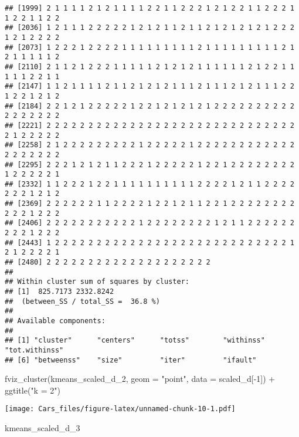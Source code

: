 \documentclass[
]{article}
\newenvironment{Shaded}{\begin{snugshade}}{\end{snugshade}}
\newcommand{\AttributeTok}[1]{\textcolor[rgb]{0.77,0.63,0.00}{#1}}
\newcommand{\DecValTok}[1]{\textcolor[rgb]{0.00,0.00,0.81}{#1}}
\newcommand{\FunctionTok}[1]{\textcolor[rgb]{0.00,0.00,0.00}{#1}}
\newcommand{\NormalTok}[1]{#1}
\newcommand{\SpecialCharTok}[1]{\textcolor[rgb]{0.00,0.00,0.00}{#1}}
\newcommand{\StringTok}[1]{\textcolor[rgb]{0.31,0.60,0.02}{#1}}
\begin{document}
\begin{verbatim}
## [1999] 2 1 1 1 1 2 1 2 1 1 1 1 2 2 1 1 2 2 2 1 2 1 2 2 1 1 2 2 2 1 1 2 2 1 1 2 2
## [2036] 1 2 1 1 1 2 2 2 2 2 1 2 1 2 1 1 2 1 1 2 1 2 1 2 1 2 1 2 2 2 1 2 1 2 2 2 2
## [2073] 1 2 2 2 1 2 2 2 2 1 1 1 1 1 1 1 1 1 2 1 1 1 1 1 1 1 1 1 2 1 2 1 1 1 1 1 2
## [2110] 2 1 1 2 1 2 2 2 1 1 1 1 1 2 1 2 1 2 1 1 1 1 1 1 2 1 2 2 1 1 1 1 1 2 2 1 1
## [2147] 1 1 2 1 1 1 1 2 1 1 2 1 2 1 2 1 1 1 2 1 1 1 2 1 2 1 1 1 2 2 1 2 2 1 2 1 2
## [2184] 2 2 1 2 1 2 2 2 2 2 1 2 2 1 2 1 2 1 2 1 2 2 2 2 2 2 2 2 2 2 2 2 2 2 2 2 2
## [2221] 2 2 2 2 2 2 2 2 2 2 2 2 2 2 2 2 2 2 2 2 2 2 2 2 2 2 2 2 2 2 2 1 2 2 2 2 2
## [2258] 2 1 2 2 2 2 2 2 2 2 2 1 2 2 2 2 2 1 2 2 2 2 2 2 2 2 2 2 2 2 2 2 2 2 2 2 2
## [2295] 2 2 2 1 2 1 2 1 1 2 2 2 1 2 2 2 2 2 1 2 2 1 2 2 2 2 2 2 2 2 1 2 2 2 2 2 1
## [2332] 1 1 2 2 2 1 2 2 1 1 1 1 1 1 1 1 1 1 2 2 2 2 1 2 1 1 2 2 2 2 2 2 2 1 2 1 2
## [2369] 2 2 2 2 2 2 1 1 2 2 2 2 1 2 2 1 2 1 1 2 2 1 2 2 2 2 2 2 2 2 2 2 2 1 2 2 2
## [2406] 2 2 2 2 2 2 2 2 2 2 2 1 2 2 2 2 2 2 2 2 1 2 1 1 2 2 2 2 2 2 2 2 2 1 2 2 2
## [2443] 1 2 2 2 2 2 2 2 2 2 2 2 2 2 2 2 2 2 2 2 2 2 2 2 2 2 2 2 2 1 2 1 2 2 2 2 1
## [2480] 2 2 2 2 2 2 2 2 2 2 2 2 2 2 2 2 2 2 2 2
## 
## Within cluster sum of squares by cluster:
## [1]  825.7173 2332.8242
##  (between_SS / total_SS =  36.8 %)
## 
## Available components:
## 
## [1] "cluster"      "centers"      "totss"        "withinss"     "tot.withinss"
## [6] "betweenss"    "size"         "iter"         "ifault"
\end{verbatim}

\begin{Shaded}
\begin{Highlighting}[]
\FunctionTok{fviz\_cluster}\NormalTok{(kmeans\_scaled\_d\_2, }\AttributeTok{geom =} \StringTok{"point"}\NormalTok{, }\AttributeTok{data =}\NormalTok{ scaled\_d[}\SpecialCharTok{{-}}\DecValTok{1}\NormalTok{]) }\SpecialCharTok{+} \FunctionTok{ggtitle}\NormalTok{(}\StringTok{"k = 2"}\NormalTok{)}
\end{Highlighting}
\end{Shaded}

\texttt{[image: Cars\_files/figure-latex/unnamed-chunk-10-1.pdf]}

\begin{Shaded}
\begin{Highlighting}[]
\NormalTok{kmeans\_scaled\_d\_3}
\end{Highlighting}
\end{Shaded}
\end{document}
